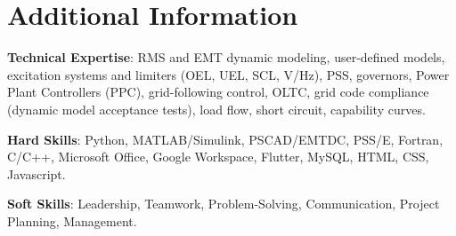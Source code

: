 \section*{Additional Information}

\noindent
\textbf{Technical Expertise}: 
RMS and EMT dynamic modeling, user-defined models, excitation systems and limiters (OEL, UEL, SCL, V/Hz), PSS, governors, Power Plant Controllers (PPC), grid-following control, OLTC, grid code compliance (dynamic model acceptance tests), load flow, short circuit, capability curves.

\noindent
\textbf{Hard Skills}: 
Python, MATLAB/Simulink, PSCAD/EMTDC, PSS/E, Fortran, C/C++, Microsoft Office, Google Workspace, Flutter, MySQL, HTML, CSS, Javascript.

\noindent
\textbf{Soft Skills}: 
Leadership, Teamwork, Problem-Solving, Communication, Project Planning, Management.
